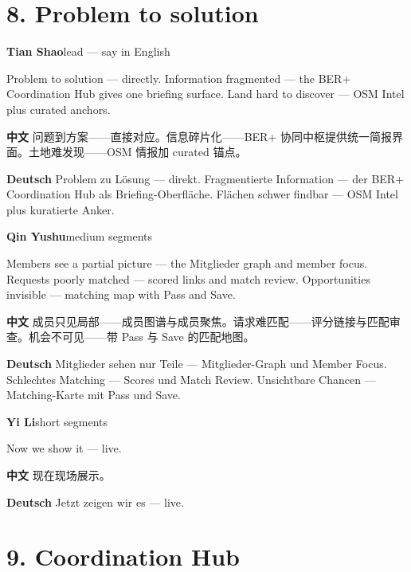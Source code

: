 \documentclass[11pt,a4paper]{ctexart}
\newenvironment{speakerblock}[2]{%
  \par\medskip
  {\color{berblue}\textbf{#1}}\hfill{\small\textcolor{bergrey}{#2}}\par
  \vspace{0.25em}
}{\par\medskip}
\begin{document}
\section{8. Problem to solution}

\begin{speakerblock}{Tian Shao}{lead — say in English}
\begin{englishbox}
Problem to solution — directly. Information fragmented — the BER+ Coordination Hub gives one briefing surface. Land hard to discover — OSM Intel plus curated anchors.
\end{englishbox}

\textbf{中文} 问题到方案——直接对应。信息碎片化——BER+ 协同中枢提供统一简报界面。土地难发现——OSM 情报加 curated 锚点。

\textbf{Deutsch} Problem zu Lösung — direkt. Fragmentierte Information — der BER+ Coordination Hub als Briefing-Oberfläche. Flächen schwer findbar — OSM Intel plus kuratierte Anker.
\end{speakerblock}


\begin{speakerblock}{Qin Yushu}{medium segments}
\begin{englishbox}
Members see a partial picture — the Mitglieder graph and member focus. Requests poorly matched — scored links and match review. Opportunities invisible — matching map with Pass and Save.
\end{englishbox}

\textbf{中文} 成员只见局部——成员图谱与成员聚焦。请求难匹配——评分链接与匹配审查。机会不可见——带 Pass 与 Save 的匹配地图。

\textbf{Deutsch} Mitglieder sehen nur Teile — Mitglieder-Graph und Member Focus. Schlechtes Matching — Scores und Match Review. Unsichtbare Chancen — Matching-Karte mit Pass und Save.
\end{speakerblock}


\begin{speakerblock}{Yi Li}{short segments}
\begin{englishbox}
Now we show it — live.
\end{englishbox}

\textbf{中文} 现在现场展示。

\textbf{Deutsch} Jetzt zeigen wir es — live.
\end{speakerblock}



\section{9. Coordination Hub}
\end{document}
